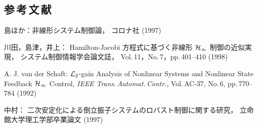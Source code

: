 
\begin{center}
\section*{参\,考\,文\,献}                      %
\end{center}

\begin{thebibliography}{99}
\label{cite:Shima1}
	島ほか：非線形システム制御論，
	コロナ社 (1997)

\label{cite:Kawata1}
	川田，島津，井上：
	Hamilton-Jacobi 方程式に基づく非線形 \({\cal H}_{\infty}\) 制御の近似実現，
	システム制御情報学会論文誌，
	Vol.\,11，No.\,7，pp.\,401--410 (1998)

\label{cite:Schaft1}
	A. J. van der Schaft: 
	\({\cal L}_{\rm 2}\)-gain Analysis of Nonlinear Systems and 
		Nonlinear State Feedback \({\cal H}_{\infty}\) Control, 
	{\it IEEE Trans.\,Automat.\,Contr.}, 
	Vol.\,AC-37, No.\,6, pp.\,770--784 (1992)

\label{cite:Nakamura1}
	中村：
	二次安定化による倒立振子システムのロバスト制御に関する研究，
	立命館大学理工学部卒業論文 (1997)

\end{thebibliography}
